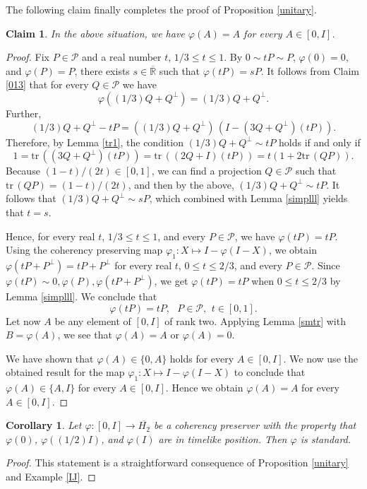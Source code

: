 \documentclass[10pt]{amsart}
\newtheorem{corollary}[theorem]{Corollary}
\newtheorem{claim}[theorem]{Claim}
\theoremstyle{definition}
\theoremstyle{remark}
\numberwithin{subsection}{section}
\numberwithin{equation}{section}
\newcommand\oH{{\overline{H_2}}}
\newcommand\oR{{\overline{\mathbb{R}}}}
\begin{document}
The following claim finally completes the proof of Proposition \ref{unitary}.

\begin{claim}
In the above situation, we have $\varphi (A) = A$ for every $A\in [0, I]$.
\end{claim}
\begin{proof}
Fix $P \in \mathcal{P}$ and a real number $t$, $1/3 \le t \le 1$. 
By $0\sim tP\sim P$, $\varphi(0)=0$, and $\varphi(P)=P$, there exists $s \in {\oR}$ such that $\varphi (tP) = sP$. 
It follows from Claim \ref{013} that for every $Q \in \mathcal{P}$ we have 
\[
\varphi ( (1/3)Q + Q^\perp) = (1/3)Q + Q^\perp.
\]
Further,
\[
(1/3)Q + Q^\perp -tP = ((1/3)Q + Q^\perp)\, (I - (3Q + Q^\perp) (tP)).
\]
Therefore, by Lemma \ref{tr1}, the condition $(1/3)Q + Q^\perp  \sim tP$ holds if and only if 
\[
1 = \mathrm{tr}\,( (3Q + Q^\perp) (tP)) = \mathrm{tr}\, ( (2Q + I)(tP)) = t (1 + 2 \mathrm{tr}\, (QP)).
\]
Because $(1-t) / (2t) \in [0,1]$, we can find a projection $Q \in \mathcal{P}$ such that  $\mathrm{tr}\, (QP) = (1-t) / (2t)$, and then by the above, 
 $(1/3)Q + Q^\perp  \sim tP$. It follows that  $(1/3)Q + Q^\perp  \sim sP$, which combined with Lemma \ref{simplll} yields that $t=s$.

Hence, for every real $t$, $1/3 \le t \le 1$, and every $P \in \mathcal{P}$, we have $\varphi (tP) = t P$. 
Using the coherency preserving map $\varphi_1 \colon X\mapsto I - \varphi (I -X)$, we obtain $\varphi (tP+P^\perp) = t P+P^\perp$ for every real $t$, $0\le t \le 2/3$, and every $P \in \mathcal{P}$. 
Since $\varphi(tP)\sim 0, \varphi(P), \varphi (tP+P^\perp)$, we get $\varphi(tP)=tP$ when $0\le t \le 2/3$ by Lemma \ref{simplll}. 
We conclude that
\[
\varphi (tP) = tP, \ \ \ P \in \mathcal{P}, \ \, t \in [0,1].
\]
Let now $A$ be any element of $[0,I]$ of rank two. Applying Lemma \ref{smtr} with $B = \varphi (A)$, we see that $\varphi (A) = A$ or $\varphi (A) = 0$. 

We have shown that $\varphi (A) \in \{0, A\}$ holds for every $A \in [0,I]$.
We now use the obtained result for the map $\varphi_1\colon X \mapsto I - \varphi ( I -X)$ to conclude that  $\varphi (A) \in \{A, I\}$ for every $A \in [0,I]$. Hence we obtain $\varphi (A) = A$ for every $A \in [0,I]$. 
\end{proof}

\begin{corollary}\label{pqyl}
Let $\varphi : [0,I] \to \oH$ be a coherency preserver with the property that $\varphi (0)$, $\varphi((1/2)I)$, and $\varphi (I)$ are in timelike position. Then $\varphi$ is standard.
\end{corollary}
\begin{proof}
This statement is a straightforward consequence of Proposition \ref{unitary} and Example \ref{IJ}.
\end{proof} 
\end{document}
